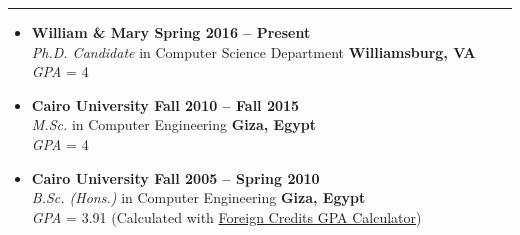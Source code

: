 \documentclass[10pt,a4]{article}
\begin{document}
\hrule
\vspace{0.2cm}



\begin{itemize}

\item{\bf William \& Mary \hfill {\bf Spring 2016 -- Present}} \\
{\it Ph.D. Candidate} in Computer Science Department \hfill {\bf Williamsburg, VA}\\
{\it GPA} = 4

\item{\bf Cairo University \hfill {\bf Fall 2010 -- Fall 2015}} \\
{\it M.Sc.} in Computer Engineering \hfill {\bf Giza, Egypt}\\
{\it GPA} = 4

\item{\bf Cairo University \hfill {\bf Fall 2005 -- Spring 2010}} \\
{\it B.Sc. (Hons.)} in Computer Engineering \hfill {\bf Giza, Egypt}\\
{\it GPA} = 3.91 (Calculated with \href{http://www.foreigncredits.com/Resources/GPA-Calculator/}{Foreign Credits GPA Calculator})

\end{itemize}
\end{document}
